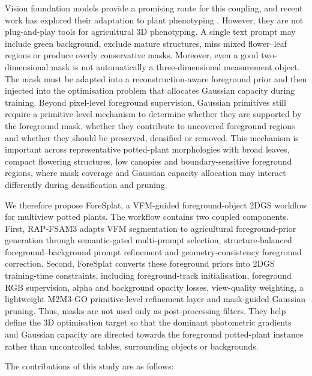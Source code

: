 \documentclass[a4paper]{cas-sc}
\begin{document}
Vision foundation models provide a promising route for this coupling, and recent work has explored their adaptation to plant phenotyping \cite{ref55}. However, they are not plug-and-play tools for agricultural 3D phenotyping. A single text prompt may include green background, exclude mature structures, miss mixed flower--leaf regions or produce overly conservative masks. Moreover, even a good two-dimensional mask is not automatically a three-dimensional measurement object. The mask must be adapted into a reconstruction-aware foreground prior and then injected into the optimisation problem that allocates Gaussian capacity during training. Beyond pixel-level foreground supervision, Gaussian primitives still require a primitive-level mechanism to determine whether they are supported by the foreground mask, whether they contribute to uncovered foreground regions and whether they should be preserved, densified or removed. This mechanism is important across representative potted-plant morphologies with broad leaves, compact flowering structures, low canopies and boundary-sensitive foreground regions, where mask coverage and Gaussian capacity allocation may interact differently during densification and pruning.

We therefore propose ForeSplat, a VFM-guided foreground-object 2DGS workflow for multiview potted plants. The workflow contains two coupled components. First, RAP-FSAM3 adapts VFM segmentation to agricultural foreground-prior generation through semantic-gated multi-prompt selection, structure-balanced foreground--background prompt refinement and geometry-consistency foreground correction. Second, ForeSplat converts these foreground priors into 2DGS training-time constraints, including foreground-track initialisation, foreground RGB supervision, alpha and background opacity losses, view-quality weighting, a lightweight M2M3-GO primitive-level refinement layer and mask-guided Gaussian pruning. Thus, masks are not used only as post-processing filters. They help define the 3D optimisation target so that the dominant photometric gradients and Gaussian capacity are directed towards the foreground potted-plant instance rather than uncontrolled tables, surrounding objects or backgrounds.

The contributions of this study are as follows:
\end{document}
